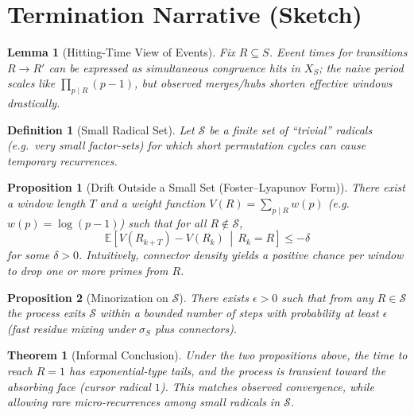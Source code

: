 \documentclass[11pt]{article}
\newtheorem{definition}{Definition}
\newtheorem{lemma}{Lemma}
\newtheorem{proposition}{Proposition}
\newtheorem{theorem}{Theorem}
\begin{document}
\section{Termination Narrative (Sketch)}

\begin{lemma}[Hitting-Time View of Events]
Fix $R\subseteq S$. Event times for transitions $R\to R'$ can be expressed as simultaneous congruence hits in $X_S$; the naive period scales like $\prod_{p\mid R}(p-1)$, but observed merges/hubs shorten effective windows drastically.
\end{lemma}

\begin{definition}[Small Radical Set]
Let $\mathcal S$ be a finite set of ``trivial'' radicals (e.g.\ very small factor-sets) for which short permutation cycles can cause temporary recurrences.
\end{definition}

\begin{proposition}[Drift Outside a Small Set (Foster--Lyapunov Form)]
There exist a window length $T$ and a weight function $V(R)=\sum_{p\mid R}w(p)$ (e.g.\ $w(p)=\log(p-1)$) such that for all $R\notin\mathcal S$,
\[
  \mathbb E\!\left[V(R_{k+T})-V(R_k)\,\middle|\,R_k=R\right]\le -\delta
\]
for some $\delta>0$. Intuitively, connector density yields a positive chance per window to drop one or more primes from $R$.
\end{proposition}

\begin{proposition}[Minorization on $\mathcal S$]
There exists $\epsilon>0$ such that from any $R\in\mathcal S$ the process exits $\mathcal S$ within a bounded number of steps with probability at least $\epsilon$ (fast residue mixing under $\sigma_S$ plus connectors).
\end{proposition}

\begin{theorem}[Informal Conclusion]
Under the two propositions above, the time to reach $R=1$ has exponential-type tails, and the process is transient toward the absorbing face (cursor radical $1$). This matches observed convergence, while allowing rare micro-recurrences among small radicals in $\mathcal S$.
\end{theorem}
\end{document}
